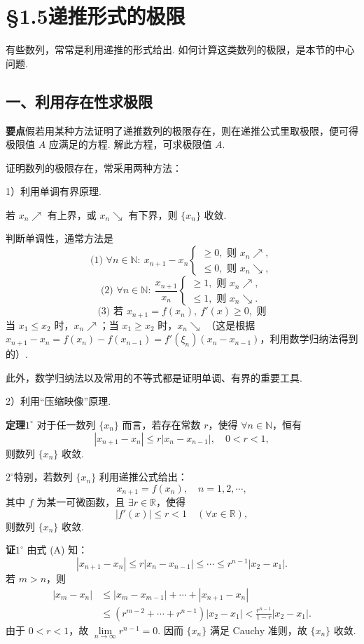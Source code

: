 \documentclass[UTF8, 12pt, fontset=fandol, oneside]{ctexart}
\begin{document}
\section*{§1.5\quad 递推形式的极限}

有些数列，常常是利用递推的形式给出. 如何计算这类数列的极限，是本节的中心问题.

\subsection*{一、利用存在性求极限}

\noindent\textbf{要点}\quad 假若用某种方法证明了递推数列的极限存在，则在递推公式里取极限，便可得极限值 $A$ 应满足的方程. 解此方程，可求极限值 $A$.

证明数列的极限存在，常采用两种方法：

1）利用单调有界原理.

若 $x_n\nearrow$ 有上界，或 $x_n\searrow$ 有下界，则 $\{x_n\}$ 收敛.

判断单调性，通常方法是
\[
  \text{(1) }\forall n\in\mathbb N:\ x_{n+1}-x_n
  \begin{cases}
    \ge0,\text{ 则 }x_n\nearrow,\\
    \le0,\text{ 则 }x_n\searrow,
  \end{cases}
\]
\[
  \text{(2) }\forall n\in\mathbb N:\ \frac{x_{n+1}}{x_n}
  \begin{cases}
    \ge1,\text{ 则 }x_n\nearrow,\\
    \le1,\text{ 则 }x_n\searrow.
  \end{cases}
\]
\[
  \text{(3) 若 }x_{n+1}=f(x_n),\ f'(x)\ge0,\text{ 则}
\]
当 $x_1\le x_2$ 时，$x_n\nearrow$；当 $x_1\ge x_2$ 时，$x_n\searrow$
（这是根据 $x_{n+1}-x_n=f(x_n)-f(x_{n-1})=f'(\xi_n)(x_n-x_{n-1})$，利用数学归纳法得到的）.

此外，数学归纳法以及常用的不等式都是证明单调、有界的重要工具.

2）利用“压缩映像”原理.

\noindent\textbf{定理}\quad $1^\circ$ 对于任一数列 $\{x_n\}$ 而言，若存在常数 $r$，使得 $\forall n\in\mathbb N$，恒有
\[
  |x_{n+1}-x_n|\le r|x_n-x_{n-1}|,\quad 0<r<1, \tag{A}
\]
则数列 $\{x_n\}$ 收敛.

$2^\circ$\quad 特别，若数列 $\{x_n\}$ 利用递推公式给出：
\[
  x_{n+1}=f(x_n), \quad n=1,2,\cdots,
\]
其中 $f$ 为某一可微函数，且 $\exists r\in\mathbb R$，使得
\[
  |f'(x)|\le r<1\quad (\forall x\in\mathbb R), \tag{B}
\]
则数列 $\{x_n\}$ 收敛.

\noindent\textbf{证}\quad $1^\circ$ 由式 (A) 知：
\[
  |x_{n+1}-x_n|\le r|x_n-x_{n-1}|\le \cdots\le r^{n-1}|x_2-x_1|.
\]
若 $m>n$，则
\[
\begin{aligned}
  |x_m-x_n|
  &\le |x_m-x_{m-1}|+\cdots+|x_{n+1}-x_n|\\
  &\le (r^{m-2}+\cdots+r^{n-1})|x_2-x_1|
  < \frac{r^{n-1}}{1-r}|x_2-x_1|.
\end{aligned}
\]
由于 $0<r<1$，故 $\lim\limits_{n\to\infty}r^{n-1}=0$. 因而 $\{x_n\}$ 满足 Cauchy 准则，故 $\{x_n\}$ 收敛.
\end{document}

